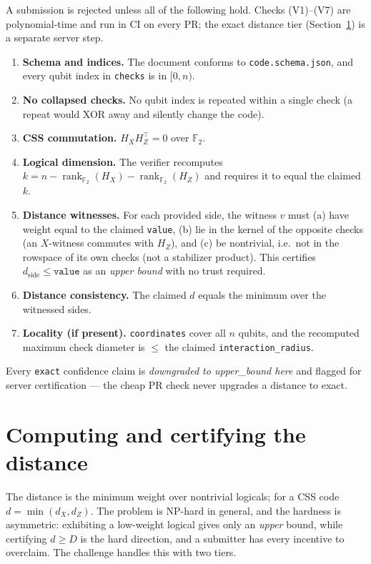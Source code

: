 \documentclass[11pt]{article}
\newcommand{\GF}{\mathbb{F}_2}
\newcommand{\HX}{H_X}
\newcommand{\HZ}{H_Z}
\newcommand{\rank}{\operatorname{rank}}
\begin{document}
	A submission is rejected unless all of the following hold. Checks
	(V1)--(V7) are polynomial-time and run in CI on every PR; the exact
	distance tier (Section~\ref{sec:distance}) is a separate server step.
	\begin{enumerate}[label=(V\arabic*),leftmargin=*,nosep]
		\item \textbf{Schema and indices.} The document conforms to
		\texttt{code.schema.json}, and every qubit index in \texttt{checks} is
		in $[0,n)$.
		\item \textbf{No collapsed checks.} No qubit index is repeated within a
		single check (a repeat would XOR away and silently change the code).
		\item \textbf{CSS commutation.} $\HX\HZ^{\!\top}=0$ over $\GF$.
		\item \textbf{Logical dimension.} The verifier recomputes
		$k = n-\rank_{\GF}(\HX)-\rank_{\GF}(\HZ)$ and requires it to equal the
		claimed $k$.
		\item \textbf{Distance witnesses.} For each provided side, the witness
		$v$ must (a) have weight equal to the claimed \texttt{value}, (b) lie in
		the kernel of the opposite checks (an $X$-witness commutes with $\HZ$),
		and (c) be nontrivial, i.e.\ not in the rowspace of its own checks (not
		a stabilizer product). This certifies $d_{\text{side}}\le\texttt{value}$
		as an \emph{upper bound} with no trust required.
		\item \textbf{Distance consistency.} The claimed $d$ equals the minimum
		over the witnessed sides.
		\item \textbf{Locality (if present).} \texttt{coordinates} cover all $n$
		qubits, and the recomputed maximum check diameter is $\le$ the claimed
		\texttt{interaction\_radius}.
	\end{enumerate}
	Every \texttt{exact} confidence claim is \emph{downgraded to
	upper\_bound here} and flagged for server certification --- the cheap PR
	check never upgrades a distance to exact.

	\section{Computing and certifying the distance}
	\label{sec:distance}

	The distance is the minimum weight over nontrivial logicals; for a CSS code
	$d=\min(d_X,d_Z)$. The problem is NP-hard in general, and the hardness is
	asymmetric: exhibiting a low-weight logical gives only an \emph{upper}
	bound, while certifying $d\ge D$ is the hard direction, and a submitter has
	every incentive to overclaim. The challenge handles this with two tiers.
\end{document}
